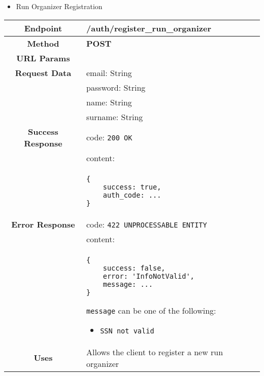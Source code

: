 \begin{itemize}
        \item Run Organizer Registration
    \end{itemize}
    \begin{adjustwidth}{1cm}{}
        \begin{longtable}{|c|l|}
            \hline
            \textbf{Endpoint} & /auth/register\_run\_organizer \\
            \hline
            \textbf{Method} & \textbf{POST} \\
            \hline
            \textbf{URL Params} &  \\
            \hline
            \textbf{Request Data} & email: String \\
            &                 password: String \\
            &                 name: String \\
            &                 surname: String \\
            \hline
            \textbf{Success Response} & code: \texttt{200 OK} \\
            &                           content: \\
            & \begin{minipage}[t]{0.5\textwidth}
                \begin{adjustwidth}{1.5cm}{}
                \begin{verbatim}
{
    success: true, 
    auth_code: ...
}
                \end{verbatim}
                \end{adjustwidth}
              \end{minipage} \\
              \hline
            \textbf{Error Response} & code: \texttt{422 UNPROCESSABLE ENTITY} \\
            &                         content: \\
            & \begin{minipage}[t]{0.7\textwidth}
                \begin{adjustwidth}{1.5cm}{}
                \begin{verbatim}
{
    success: false, 
    error: 'InfoNotValid',
    message: ...
}
                \end{verbatim}
                \end{adjustwidth}
                \texttt{message} can be one of the following: 
                \begin{itemize}
                    \item \texttt{SSN not valid}
                \end{itemize}
              \end{minipage} \\
              \hline
            \textbf{Uses} & Allows the client to register a new run organizer \\
            \hline
        \end{longtable}
    \end{adjustwidth}

